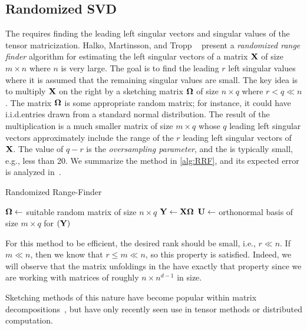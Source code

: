 \subsection{Randomized SVD}
The \MTFSBC requires finding the leading left singular vectors and singular values of the tensor 
matricization. Halko, Martinsson, and Tropp ~\cite[Alg.~4.1]{halko} present a \emph{randomized range finder} algorithm 
for estimating the left singular vectors of a matrix $\M{X}$ of size $m \times n$ where $n$ is very large.
The goal is to find the leading $r$ left singular values where it is assumed that the remaining singular values are small.
The key idea is to multiply $\M{X}$ on the right
by a sketching matrix $\M{\Omega}$ of size $n \times q$ where $r < q \ll n$.
The matrix $\M{\Omega}$ is some appropriate random matrix;
for instance, it could have i.i.d.\@ entries drawn from a standard normal distribution.
The result of the multiplication is a much smaller matrix of size $m \times q$ whose $q$ leading left singular vectors approximately include the range of the $r$ leading left singular vectors of $\M{X}$.
The value of $q-r$ is the \emph{oversampling parameter}, and the is typically small, e.g., less than 20.
We summarize the method in \cref{alg:RRF}, and its expected error is analyzed in~\cite{halko}.

\begin{algorithm}[htb]
  \caption{Randomized Range-Finder}\label{alg:RRF}
  \begin{algorithmic}[1]
     
    \State $\M{\Omega} \gets$ suitable random matrix of size ${n \times q}$ 
    \State $\M{Y} \gets \M{X}\M{\Omega}$
    \State \label{line:rrf:ortho} $\M{U} \gets$ orthonormal basis of size $m \times q$ for $(\M{Y})$
    \EndProcedure
  \end{algorithmic}
  \label{alg:rrf}
\end{algorithm}

For this method to be efficient, the desired rank should be small, i.e., $r \ll n$.
If $m \ll n$, then we know that $r \leq m \ll n$, so this property is satisfied. Indeed, we will observe that the matrix
unfoldings in the \MTFSBC have exactly that property since we are working with matrices of roughly 
$n \times n^{d-1}$ in size. 

Sketching methods of this nature have become popular within matrix decompositions~\cite{tropp2}, but have only recently seen use in tensor methods or distributed computation. 
%
